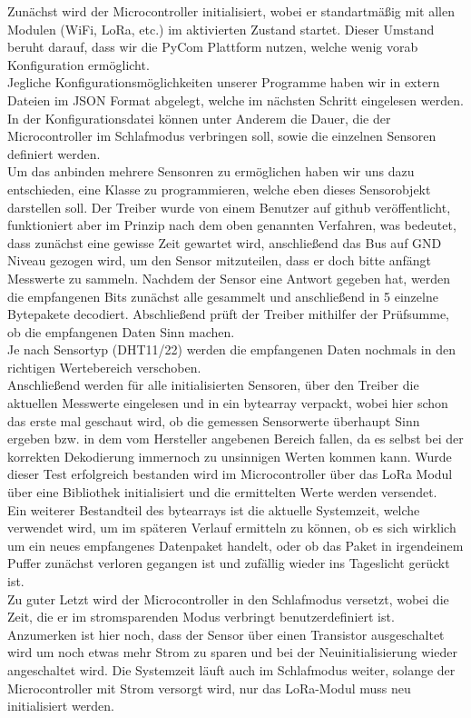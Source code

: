 Zunächst wird der Microcontroller initialisiert, wobei er standartmäßig mit allen Modulen (WiFi, LoRa, etc.) im aktivierten Zustand startet. Dieser Umstand beruht darauf, dass wir die PyCom Plattform nutzen, welche wenig vorab Konfiguration ermöglicht.\\
Jegliche Konfigurationsmöglichkeiten unserer Programme haben wir in extern Dateien im JSON Format abgelegt, welche im nächsten Schritt eingelesen werden. In der Konfigurationsdatei können unter Anderem die Dauer, die der Microcontroller im Schlafmodus verbringen soll, sowie die einzelnen Sensoren definiert werden.\\
Um das anbinden mehrere Sensonren zu ermöglichen haben wir uns dazu entschieden, eine Klasse zu programmieren, welche eben dieses Sensorobjekt darstellen soll. Der Treiber wurde von einem Benutzer auf github veröffentlicht, funktioniert aber im Prinzip nach dem oben genannten Verfahren, was bedeutet, dass zunächst eine gewisse Zeit gewartet wird, anschließend das Bus auf GND Niveau gezogen wird, um den Sensor mitzuteilen, dass er doch bitte anfängt Messwerte zu sammeln. Nachdem der Sensor eine Antwort gegeben hat, werden die empfangenen Bits zunächst alle gesammelt und anschließend in 5 einzelne Bytepakete decodiert. Abschließend prüft der Treiber mithilfer der Prüfsumme, ob die empfangenen Daten Sinn machen.\\ Je nach Sensortyp (DHT11/22) werden die empfangenen Daten nochmals in den richtigen Wertebereich \grqq verschoben\grqq.\\
Anschließend werden für alle initialisierten Sensoren, über den Treiber die aktuellen Messwerte eingelesen und in ein bytearray verpackt, wobei hier schon das erste mal geschaut wird, ob die gemessen Sensorwerte überhaupt Sinn ergeben bzw. in dem vom Hersteller angebenen Bereich fallen, da es selbst bei der korrekten Dekodierung immernoch zu unsinnigen Werten kommen kann. 
Wurde dieser Test erfolgreich bestanden wird im Microcontroller über das LoRa Modul über eine Bibliothek initialisiert und die ermittelten Werte werden versendet.\\ Ein weiterer Bestandteil des bytearrays ist die aktuelle Systemzeit, welche verwendet wird, um im späteren Verlauf ermitteln zu können, ob es sich wirklich um ein neues empfangenes Datenpaket handelt, oder ob das Paket in irgendeinem Puffer zunächst verloren gegangen ist und zufällig wieder ins Tageslicht gerückt ist.\\
Zu guter Letzt wird der Microcontroller in den Schlafmodus versetzt, wobei die Zeit, die er im stromsparenden Modus verbringt benutzerdefiniert ist. Anzumerken ist hier noch, dass der Sensor über einen Transistor ausgeschaltet wird um noch etwas mehr Strom zu sparen und bei der Neuinitialisierung wieder angeschaltet wird. Die Systemzeit läuft auch im Schlafmodus weiter, solange der Microcontroller mit Strom versorgt wird, nur das LoRa-Modul muss neu initialisiert werden.\\

